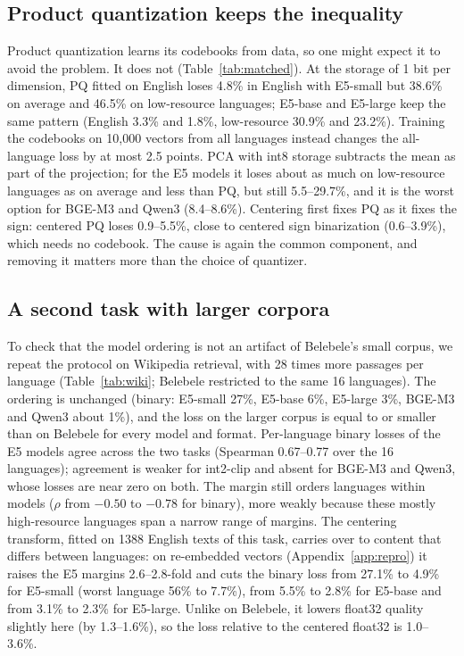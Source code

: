 \documentclass[11pt]{article}
\begin{document}
\subsection{Product quantization keeps the inequality}\label{sec:matched}

Product quantization learns its codebooks from data, so one might expect it to avoid the problem. It does not (Table~\ref{tab:matched}). At the storage of 1 bit per dimension, PQ fitted on English loses 4.8\% in English with E5-small but 38.6\% on average and 46.5\% on low-resource languages; E5-base and E5-large keep the same pattern (English 3.3\% and 1.8\%, low-resource 30.9\% and 23.2\%). Training the codebooks on 10{,}000 vectors from all languages instead changes the all-language loss by at most 2.5 points. PCA with int8 storage subtracts the mean as part of the projection; for the E5 models it loses about as much on low-resource languages as on average and less than PQ, but still 5.5--29.7\%, and it is the worst option for BGE-M3 and Qwen3 (8.4--8.6\%). Centering first fixes PQ as it fixes the sign: centered PQ loses 0.9--5.5\%, close to centered sign binarization (0.6--3.9\%), which needs no codebook. The cause is again the common component, and removing it matters more than the choice of quantizer.

\subsection{A second task with larger corpora}\label{sec:wiki}

To check that the model ordering is not an artifact of Belebele's small corpus, we repeat the protocol on Wikipedia retrieval, with 28 times more passages per language (Table~\ref{tab:wiki}; Belebele restricted to the same 16 languages). The ordering is unchanged (binary: E5-small 27\%, E5-base 6\%, E5-large 3\%, BGE-M3 and Qwen3 about 1\%), and the loss on the larger corpus is equal to or smaller than on Belebele for every model and format. Per-language binary losses of the E5 models agree across the two tasks (Spearman 0.67--0.77 over the 16 languages); agreement is weaker for int2-clip and absent for BGE-M3 and Qwen3, whose losses are near zero on both. The margin still orders languages within models ($\rho$ from $-0.50$ to $-0.78$ for binary), more weakly because these mostly high-resource languages span a narrow range of margins. The centering transform, fitted on 1388 English texts of this task, carries over to content that differs between languages: on re-embedded vectors (Appendix~\ref{app:repro}) it raises the E5 margins 2.6--2.8-fold and cuts the binary loss from 27.1\% to 4.9\% for E5-small (worst language 56\% to 7.7\%), from 5.5\% to 2.8\% for E5-base and from 3.1\% to 2.3\% for E5-large. Unlike on Belebele, it lowers float32 quality slightly here (by 1.3--1.6\%), so the loss relative to the centered float32 is 1.0--3.6\%.
\end{document}
